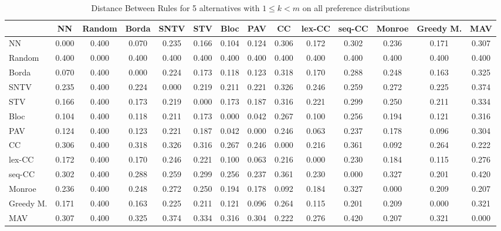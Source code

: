 
\begin{table*}
\centering
\begin{tabular}{lccccccccccccc}
\toprule
 & NN & Random & Borda & SNTV & STV & Bloc & PAV & CC & lex-CC & seq-CC & Monroe & Greedy M. & MAV \\
\midrule
NN & 0.000 & 0.400 & 0.070 & 0.235 & 0.166 & 0.104 & 0.124 & 0.306 & 0.172 & 0.302 & 0.236 & 0.171 & 0.307 \\
Random & 0.400 & 0.000 & 0.400 & 0.400 & 0.400 & 0.400 & 0.400 & 0.400 & 0.400 & 0.400 & 0.400 & 0.400 & 0.400 \\
Borda & 0.070 & 0.400 & 0.000 & 0.224 & 0.173 & 0.118 & 0.123 & 0.318 & 0.170 & 0.288 & 0.248 & 0.163 & 0.325 \\
SNTV & 0.235 & 0.400 & 0.224 & 0.000 & 0.219 & 0.211 & 0.221 & 0.326 & 0.246 & 0.259 & 0.272 & 0.225 & 0.374 \\
STV & 0.166 & 0.400 & 0.173 & 0.219 & 0.000 & 0.173 & 0.187 & 0.316 & 0.221 & 0.299 & 0.250 & 0.211 & 0.334 \\
Bloc & 0.104 & 0.400 & 0.118 & 0.211 & 0.173 & 0.000 & 0.042 & 0.267 & 0.100 & 0.256 & 0.194 & 0.121 & 0.316 \\
PAV & 0.124 & 0.400 & 0.123 & 0.221 & 0.187 & 0.042 & 0.000 & 0.246 & 0.063 & 0.237 & 0.178 & 0.096 & 0.304 \\
CC & 0.306 & 0.400 & 0.318 & 0.326 & 0.316 & 0.267 & 0.246 & 0.000 & 0.216 & 0.361 & 0.092 & 0.264 & 0.222 \\
lex-CC & 0.172 & 0.400 & 0.170 & 0.246 & 0.221 & 0.100 & 0.063 & 0.216 & 0.000 & 0.230 & 0.184 & 0.115 & 0.276 \\
seq-CC & 0.302 & 0.400 & 0.288 & 0.259 & 0.299 & 0.256 & 0.237 & 0.361 & 0.230 & 0.000 & 0.327 & 0.201 & 0.420 \\
Monroe & 0.236 & 0.400 & 0.248 & 0.272 & 0.250 & 0.194 & 0.178 & 0.092 & 0.184 & 0.327 & 0.000 & 0.209 & 0.207 \\
Greedy M. & 0.171 & 0.400 & 0.163 & 0.225 & 0.211 & 0.121 & 0.096 & 0.264 & 0.115 & 0.201 & 0.209 & 0.000 & 0.321 \\
MAV & 0.307 & 0.400 & 0.325 & 0.374 & 0.334 & 0.316 & 0.304 & 0.222 & 0.276 & 0.420 & 0.207 & 0.321 & 0.000 \\
\bottomrule
\end{tabular}

\caption{Distance Between Rules for 5 alternatives with $1 \leq k < m$ on all preference distributions}
\end{table*}
